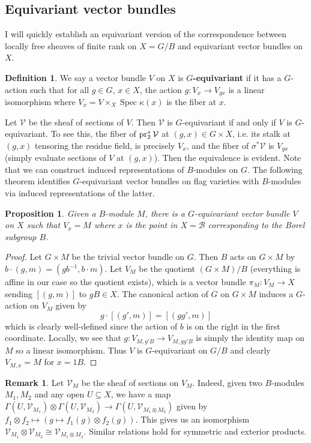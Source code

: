 \documentclass[11pt, a4paper]{article}
\newtheorem{proposition}[theorem]{Proposition}
\theoremstyle{definition}
\newtheorem{remark}[theorem]{Remark}
\newtheorem{definition}[theorem]{Definition}
\newcommand{\s}[0]{\sigma}
\newcommand{\Spec}[0]{\operatorname{Spec}}
\begin{document}
    \subsection{Equivariant vector bundles}\label{sec-equiv}
    I will quickly establish an equivariant version of the correspondence between locally free sheaves of finite rank on $X=G/B$ and equivariant vector bundles on $X$.
    \begin{definition}
        We say a vector bundle $V$ on $X$ is \textbf{$G$-equivariant} if it has a $G$-action such that for all $g\in G$, $x\in X$, the action $g:V_{x}\to V_{gx}$ is a linear isomorphism where $V_x=V\times_X\Spec \kappa(x)$ is the fiber at $x$.
    \end{definition}
    Let $\mathcal V$ be the sheaf of sections of $V$. Then $\mathcal V$ is $G$-equivariant if and only if $V$ is $G$-equivariant. To see this, the fiber of $\operatorname{pr}_2^*\mathcal V$ at $(g, x)\in G\times X$, i.e. its stalk at $(g, x)$ tensoring the residue field, is precisely $V_x$, and the fiber of $\s^*\mathcal V$ is $V_{gx}$ (simply evaluate sections of $V$ at $(g, x)$). Then the equivalence is evident. Note that we can construct induced representations of $B$-modules on $G$. The following theorem identifies $G$-equivariant vector bundles on flag varieties with $B$-modules via induced representations of the latter.
    \begin{proposition}\label{prop-vec-bundle}
        Given a $B$-module $M$, there is a $G$-equivariant vector bundle $V$ on $X$ such that $V_x=M$ where $x$ is the point in $X=\mathcal B$ corresponding to the Borel subgroup $B$.
    \end{proposition}
    \begin{proof}
        Let $G\times M$ be the trivial vector bundle on $G$. Then $B$ acts on $G\times M$ by $b\cdot (g, m)=(gb^{-1},b\cdot m)$. Let $V_M$ be the quotient $(G\times M)/B$ (everything is affine in our case so the quotient exists), which is a vector bundle $\pi_M:V_M\to X$ sending $[(g, m)]$ to $gB\in X$. The canonical action of $G$ on $G\times M$ induces a $G$-action on $V_M$ given by
        \[g\cdot [(g', m)]=[(gg', m)]\]
        which is clearly well-defined since the action of $b$ is on the right in the first coordinate. Locally, we see that $g:V_{M, g'B}\to V_{M, gg'B}$ is simply the identity map on $M$ so a linear isomorphism. Thus $V$ is $G$-equivariant on $G/B$ and clearly $V_{M,x}=M$ for $x=1B$.
    \end{proof}
    \begin{remark}\label{rmk-tensor-sheaf}
        Let $\mathcal V_M$ be the sheaf of sections on $V_M$. Indeed, given two $B$-modules $M_1, M_2$ and any open $U\subseteq X$, we have a map $\Gamma(U,\mathcal V_{M_1})\otimes\Gamma(U, \mathcal V_{M_2})\to \Gamma(U,\mathcal V_{M_1\otimes M_2})$ given by $f_1\otimes f_2\mapsto (g\mapsto f_1(g)\otimes f_2(g))$. This gives us an isomorphism $\mathcal V_{M_1}\otimes\mathcal V_{M_2}\cong \mathcal V_{M_1\otimes M_2}$. Similar relations hold for symmetric and exterior products.
    \end{remark}
\end{document}
